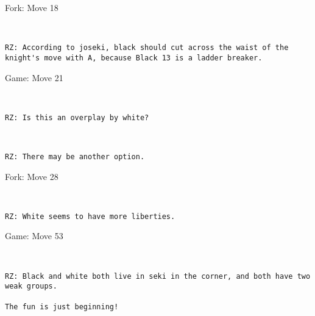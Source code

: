 \documentclass{article}
\begin{document}
\begin{subsection}{Fork: Move 18}
\begin{center}
\cleargoban
{}
\showfullgoban
\\\begin{lstlisting}
RZ: According to joseki, black should cut across the waist of the knight's move with A, because Black 13 is a ladder breaker.\end{lstlisting}
\end{center}
\end{subsection}
\newpage
\begin{section}{Game: Move 21}
\begin{center}
\cleargoban
{}
\showfullgoban
\\\begin{lstlisting}
RZ: Is this an overplay by white?\end{lstlisting}
\end{center}
\begin{center}
\cleargoban
{}
\showfullgoban
\\\begin{lstlisting}
RZ: There may be another option.\end{lstlisting}
\end{center}
\end{section}
\begin{subsection}{Fork: Move 28}
\begin{center}
\cleargoban
{}
\showfullgoban
\\\begin{lstlisting}
RZ: White seems to have more liberties.\end{lstlisting}
\end{center}
\end{subsection}
\newpage
\begin{section}{Game: Move 53}
\begin{center}
\cleargoban
{}
\showfullgoban
\\\begin{lstlisting}
RZ: Black and white both live in seki in the corner, and both have two weak groups.

The fun is just beginning!\end{lstlisting}
\end{center}
\end{section}
\end{document}
